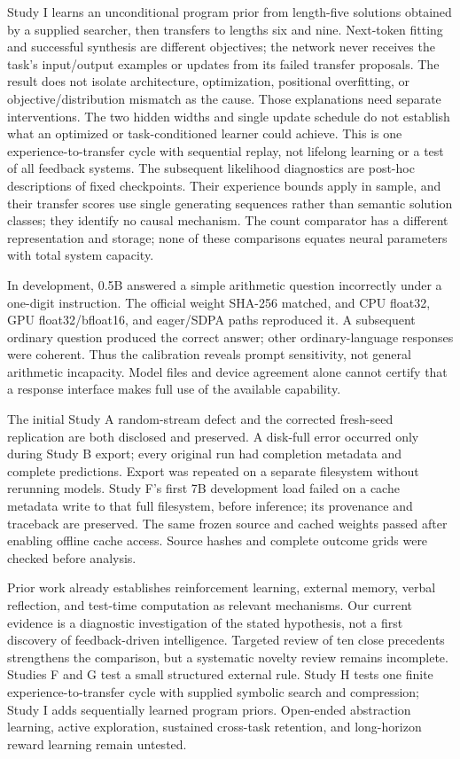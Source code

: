 \documentclass[11pt]{article}
\begin{document}
Study I learns an unconditional program prior from length-five solutions
obtained by a supplied searcher, then transfers to lengths six and nine.
Next-token fitting and successful synthesis are different objectives; the
network never receives the task's input/output examples or updates from its
failed transfer proposals. The result does not isolate architecture,
optimization, positional overfitting, or objective/distribution mismatch as
the cause. Those explanations need separate interventions. The two hidden
widths and single update schedule do not establish what an optimized or
task-conditioned learner could achieve. This is one experience-to-transfer
cycle with sequential replay, not lifelong learning or a test of all feedback
systems. The subsequent likelihood diagnostics are post-hoc descriptions of
fixed checkpoints. Their experience bounds apply in sample, and their transfer
scores use single generating sequences rather than semantic solution classes;
they identify no causal mechanism. The count comparator has a different representation and storage;
none of these comparisons equates neural parameters with total system capacity.

In development, 0.5B answered a simple arithmetic question incorrectly under
a one-digit instruction. The official weight SHA-256 matched, and CPU float32,
GPU float32/bfloat16, and eager/SDPA paths reproduced it. A subsequent ordinary
question produced the correct answer; other ordinary-language responses were
coherent. Thus the calibration reveals prompt sensitivity, not general
arithmetic incapacity. Model files and device agreement alone cannot certify
that a response interface makes full use of the available capability.

The initial Study A random-stream defect and the corrected fresh-seed
replication are both disclosed and preserved. A disk-full error occurred only
during Study B export; every original run had completion metadata and complete
predictions. Export was repeated on a separate filesystem without rerunning
models. Study F's first 7B development load failed on a cache metadata write
to that full filesystem, before inference; its provenance and traceback are
preserved. The same frozen source and cached weights passed after enabling
offline cache access. Source hashes and complete outcome grids were checked
before analysis.

Prior work already establishes reinforcement learning, external memory,
verbal reflection, and test-time computation as relevant mechanisms. Our
current evidence is a diagnostic investigation of the stated hypothesis, not
a first discovery of feedback-driven intelligence. Targeted review of ten
close precedents strengthens the comparison, but a systematic novelty review
remains incomplete. Studies F and G test a small structured external rule.
Study H tests one finite experience-to-transfer cycle with supplied symbolic
search and compression; Study I adds sequentially learned program priors.
Open-ended abstraction learning, active exploration,
sustained cross-task retention, and long-horizon reward learning remain untested.
\end{document}
